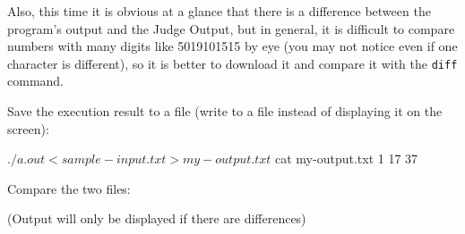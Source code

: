 Also, this time it is obvious at a glance that there is a difference between the program's output and the Judge Output, but in general, it is difficult to compare numbers with many digits like 5019101515 by eye (you may not notice even if one character is different), so it is better to download it and compare it with the \texttt{diff} command.

Save the execution result to a file (write to a file instead of displaying it on the screen):
\begin{terminal}
$ ./a.out < sample-input.txt > my-output.txt
$ cat my-output.txt
1 17 37
\end{terminal}

Compare the two files:
(Output will only be displayed if there are differences)
